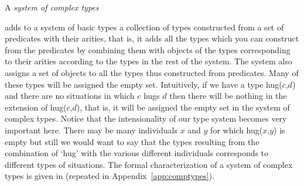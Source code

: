A \textit{system of complex types} 
adds to a system of basic types a collection of types constructed from
a set of predicates with their arities, that is, it adds all the types
which you can construct from the predicates by combining them with
objects of the types corresponding to their arities according to the
types in the rest of the system.  The system also assigns a set of
objects to all the types thus constructed from predicates.  Many of
these types will be assigned the empty set.  Intuitively, if we have a
type hug($c$,$d$) and there are no situations in which $c$ hugs $d$
then there will be nothing in the extension of hug($c$,$d$), that is,
it will be assigned the empty set in the system of complex types.
Notice that the intensionality of our type system becomes very
important here.  There may be many individuals $x$ and $y$ for which
hug($x$,$y$) is empty but still we would want to say that the types
resulting from the combination of  `hug'
with the various different individuals corresponds to
different types of situations.  The formal characterization of a
system of complex types is given in \nexteg{} (repeated in
Appendix~\ref{app:comptypes}).
